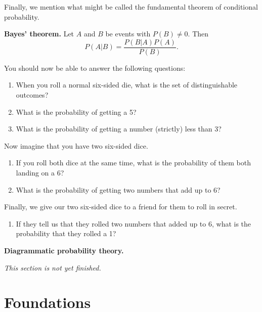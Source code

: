 \documentclass[fleqn,a4paper]{article}
\providecommand{\tightlist}{\setlength{\itemsep}{0pt}\setlength{\parskip}{0pt}}
\newenvironment{idea}{\everypar{\setlength{\parindent}{1.5em}}}{}
\newenvironment{technical}[1]{\textbf{#1.}\par\vspace{.5\baselineskip}\everypar{\setlength{\parindent}{1.5em}}}{}
\newenvironment{todo}{\color{primary}\emph{This section is not yet finished.}}{}
\let\oldpart\part
\renewcommand\part{\clearpage\oldpart}
\theoremstyle{definition}
\theoremstyle{definition}
\theoremstyle{definition}
\theoremstyle{definition}
\theoremstyle{remark}
\begin{document}
Finally, we mention what might be called the fundamental theorem of conditional probability.

\begin{idea}
\textbf{Bayes' theorem.}
Let \(A\) and \(B\) be events with \(P(B)\neq0\).
Then
\[
  P(A|B)
  = \frac{P(B|A)P(A)}{P(B)}.
\]

\end{idea}

You should now be able to answer the following questions:

\begin{enumerate}
\def\labelenumi{\arabic{enumi}.}
\tightlist
\item
  When you roll a normal six-sided die, what is the set of distinguishable outcomes?
\item
  What is the probability of getting a 5?
\item
  What is the probability of getting a number (strictly) less than 3?
\end{enumerate}

Now imagine that you have two six-sided dice.

\begin{enumerate}
\def\labelenumi{\arabic{enumi}.}
\setcounter{enumi}{3}
\tightlist
\item
  If you roll both dice at the same time, what is the probability of them both landing on a 6?
\item
  What is the probability of getting two numbers that add up to 6?
\end{enumerate}

Finally, we give our two six-sided dice to a friend for them to roll in secret.

\begin{enumerate}
\def\labelenumi{\arabic{enumi}.}
\setcounter{enumi}{5}
\tightlist
\item
  If they tell us that they rolled two numbers that added up to 6, what is the probability that they rolled a 1?
\end{enumerate}

\begin{technical}{Diagrammatic probability theory}

\begin{todo}

\end{todo}

\end{technical}

\hypertarget{part-foundations}{%
\part{Foundations}\label{part-foundations}}
\end{document}
